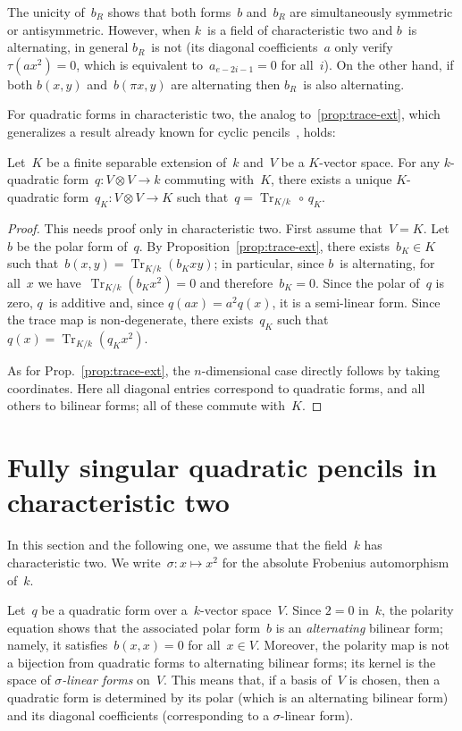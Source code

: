 \documentclass{lms}
\DeclareMathOperator\Tr{Tr}
\begin{document}
The unicity of~$b_R$ shows that both forms~$b$ and~$b_R$ are
simultaneously symmetric or antisymmetric.
However, when $k$~is a field of characteristic two
and $b$~is alternating, in general $b_R$~is not
(its diagonal coefficients~$a$ only verify~$τ(a x^2) = 0$,
which is equivalent to~$a_{e-2i-1} = 0$ for all~$i$).
On the other hand, if both $b(x,y)$ and~$b(π x, y)$ are alternating
then $b_R$~is also alternating.

\medskip
For quadratic forms in characteristic two,
the analog to~\ref{prop:trace-ext},
which generalizes a result already known
for cyclic pencils~\cite[Prop.~5]{MPG2013}, holds:
\begin{prop} \label{prop:trace-quad}
Let~$K$ be a finite separable extension of~$k$ and~$V$ be a $K$-vector
space. For any $k$-quadratic form~$q: V ⊗ V → k$ commuting with~$K$,
there exists a unique $K$-quadratic form~$q_K: V ⊗ V → K$ such that~$q =
\Tr_{K/k} \, ∘ \, q_K$.
\end{prop}
\begin{proof}
This needs proof only in characteristic two.
First assume that~$V = K$.
Let~$b$ be the polar form of~$q$.
By Proposition~\ref{prop:trace-ext},
there exists~$b_K ∈ K$ such that~$b(x,y) = \Tr_{K/k} (b_K xy)$;
in particular, since $b$~is alternating,
for all~$x$ we have~$\Tr_{K/k} (b_K x^2) = 0$ and therefore~$b_K = 0$.
Since the polar of~$q$ is zero, $q$~is additive
and, since $q(a x) = a^2 q(x)$, it is a semi-linear form.
Since the trace map is non-degenerate,
there exists~$q_K$ such that~$q(x) = \Tr_{K/k} (q_K x^2)$.

As for Prop.~\ref{prop:trace-ext}, the $n$-dimensional case directly follows by
taking coordinates. Here all diagonal entries correspond to quadratic
forms, and all others to bilinear forms; all of these commute with~$K$.
\end{proof}



\section{Fully singular quadratic pencils in characteristic two}
\label{S:quad-sing}
In this section and the following one, we assume that the field~$k$ has
characteristic two.
We write~$σ: x ↦ x^2$ for the absolute Frobenius automorphism of~$k$.

Let~$q$ be a quadratic form over a~$k$-vector space~$V$. Since $2 = 0$
in~$k$, the polarity equation shows that the associated polar form~$b$ is
an \emph{alternating} bilinear form; namely, it satisfies~$b(x,x) = 0$
for all~$x ∈ V$. Moreover, the polarity map is not a bijection from
quadratic forms to alternating bilinear forms; its kernel is the space of
\emph{$σ$-linear forms} on~$V$. This means that, if a basis of~$V$ is
chosen, then a quadratic form is determined by its polar (which is an
alternating bilinear form) and its diagonal coefficients (corresponding to a
$σ$-linear form).
\end{document}
